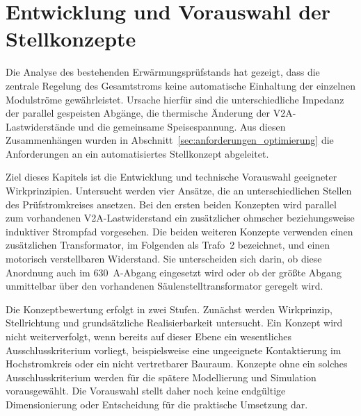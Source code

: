 \begingroup
\setlength{\emergencystretch}{0.75em}

\section{Entwicklung und Vorauswahl der Stellkonzepte}
\label{chap:entwicklung_stellkonzept}
\label{chap:konzeptentwicklung}

Die Analyse des bestehenden Erwärmungsprüfstands hat gezeigt, dass die
zentrale Regelung des Gesamtstroms keine automatische Einhaltung der
einzelnen Modulströme gewährleistet. Ursache hierfür sind die unterschiedliche
Impedanz der parallel gespeisten Abgänge, die thermische Änderung der
V2A-Lastwiderstände und die gemeinsame Speisespannung. Aus diesen
Zusammenhängen wurden in Abschnitt~\ref{sec:anforderungen_optimierung} die
Anforderungen an ein automatisiertes Stellkonzept abgeleitet.

Ziel dieses Kapitels ist die Entwicklung und technische Vorauswahl geeigneter
Wirkprinzipien. Untersucht werden vier Ansätze, die an unterschiedlichen
Stellen des Prüfstromkreises ansetzen. Bei den ersten beiden Konzepten wird
parallel zum vorhandenen V2A-Lastwiderstand ein zusätzlicher ohmscher
beziehungsweise induktiver Strompfad vorgesehen. Die beiden weiteren
Konzepte verwenden einen zusätzlichen Transformator, im Folgenden als
Trafo~2 bezeichnet, und einen motorisch verstellbaren Widerstand. Sie
unterscheiden sich darin, ob diese Anordnung auch im
\SI{630}{\ampere}-Abgang eingesetzt wird oder ob der größte Abgang unmittelbar
über den vorhandenen Säulenstelltransformator geregelt wird.

Die Konzeptbewertung erfolgt in zwei Stufen. Zunächst werden Wirkprinzip,
Stellrichtung und grundsätzliche Realisierbarkeit untersucht. Ein Konzept wird
nicht weiterverfolgt, wenn bereits auf dieser Ebene ein wesentliches
Ausschluss\-kriterium vorliegt, beispielsweise eine ungeeignete Kontaktierung im
Hochstrom\-kreis oder ein nicht vertretbarer Bauraum. Konzepte ohne ein solches
Ausschluss\-kriterium werden für die spätere Modellierung und Simulation
vorausgewählt. Die Vorauswahl stellt daher noch keine endgültige
Dimensionierung oder Entscheidung für die praktische Umsetzung dar.


